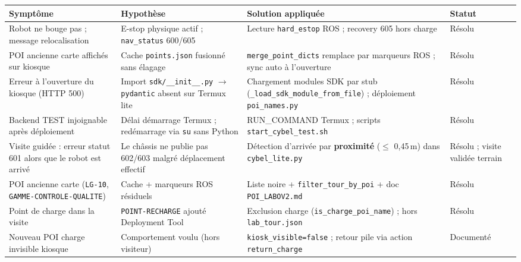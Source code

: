 \documentclass[11pt,a4paper]{article}
\begin{document}
\begin{longtable}{@{}p{}p{}p{}p{}@{}}
\toprule
\textbf{Symptôme} & \textbf{Hypothèse} & \textbf{Solution appliquée} & \textbf{Statut} \\
\midrule
\endhead

Robot ne bouge pas ; message relocalisation & E-stop physique actif ; \texttt{nav\_status} 600/605 & Lecture \texttt{hard\_estop} ROS ; recovery 605 hors charge & Résolu \\

POI ancienne carte affichés sur kiosque & Cache \texttt{points.json} fusionné sans élagage & \texttt{merge\_point\_dicts} remplace par marqueurs ROS ; sync auto à l'ouverture & Résolu \\

Erreur à l'ouverture du kiosque (HTTP 500) & Import \texttt{sdk/\_\_init\_\_.py} $\rightarrow$ \texttt{pydantic} absent sur Termux lite & Chargement modules SDK par stub (\texttt{\_load\_sdk\_module\_from\_file}) ; déploiement \texttt{poi\_names.py} & Résolu \\

Backend TEST injoignable après déploiement & Délai démarrage Termux ; redémarrage via \texttt{su} sans Python & RUN\_COMMAND Termux ; scripts \texttt{start\_cybel\_test.sh} & Résolu \\

Visite guidée : erreur statut 601 alors que le robot est arrivé & Le châssis ne publie pas 602/603 malgré déplacement effectif & Détection d'arrivée par \textbf{proximité} ($\leq$ 0{,}45\,m) dans \texttt{cybel\_lite.py} & Résolu ; visite validée terrain \\

POI ancienne carte (\texttt{LG-10}, \texttt{GAMME-CONTROLE-QUALITE}) & Cache + marqueurs ROS résiduels & Liste noire + \texttt{filter\_tour\_by\_poi} + doc \texttt{POI\_LABOV2.md} & Résolu \\

Point de charge dans la visite & \texttt{POINT-RECHARGE} ajouté Deployment Tool & Exclusion charge (\texttt{is\_charge\_poi\_name}) ; hors \texttt{lab\_tour.json} & Résolu \\

Nouveau POI charge invisible kiosque & Comportement voulu (hors visiteur) & \texttt{kiosk\_visible=false} ; retour pile via action \texttt{return\_charge} & Documenté \\

\bottomrule
\end{longtable}
\end{document}
